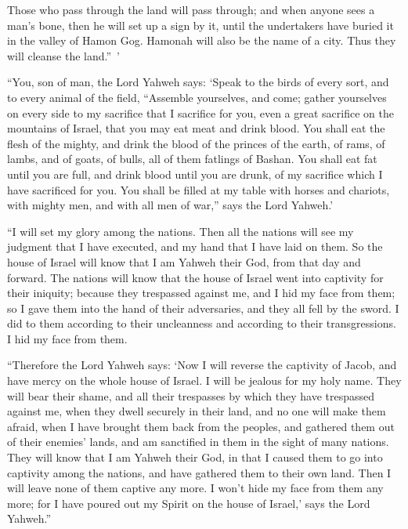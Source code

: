 {Those who pass through the land will pass through; and when anyone sees a man’s bone, then he will set up a sign by it, until the undertakers have buried it in the valley of Hamon Gog.
Hamonah will also be the name of a city. Thus they will cleanse the land.” ’
\par }{\PP {}“You, son of man, the Lord Yahweh says: ‘Speak to the birds of every sort, and to every animal of the field, “Assemble yourselves, and come; gather yourselves on every side to my sacrifice that I sacrifice for you, even a great sacrifice on the mountains of Israel, that you may eat meat and drink blood.
You shall eat the flesh of the mighty, and drink the blood of the princes of the earth, of rams, of lambs, and of goats, of bulls, all of them fatlings of Bashan.
You shall eat fat until you are full, and drink blood until you are drunk, of my sacrifice which I have sacrificed for you.
You shall be filled at my table with horses and chariots, with mighty men, and with all men of war,” says the Lord Yahweh.’
\par }{\PP {}“I will set my glory among the nations. Then all the nations will see my judgment that I have executed, and my hand that I have laid on them.
So the house of Israel will know that I am Yahweh their God, from that day and forward.
The nations will know that the house of Israel went into captivity for their iniquity; because they trespassed against me, and I hid my face from them; so I gave them into the hand of their adversaries, and they all fell by the sword.
I did to them according to their uncleanness and according to their transgressions. I hid my face from them.
\par }{\PP {}“Therefore the Lord Yahweh says: ‘Now I will reverse the captivity of Jacob, and have mercy on the whole house of Israel. I will be jealous for my holy name.
They will bear their shame, and all their trespasses by which they have trespassed against me, when they dwell securely in their land, and no one will make them afraid,
when I have brought them back from the peoples, and gathered them out of their enemies’ lands, and am sanctified in them in the sight of many nations.
They will know that I am Yahweh their God, in that I caused them to go into captivity among the nations, and have gathered them to their own land. Then I will leave none of them captive any more.
I won’t hide my face from them any more; for I have poured out my Spirit on the house of Israel,’ says the Lord Yahweh.”

}
